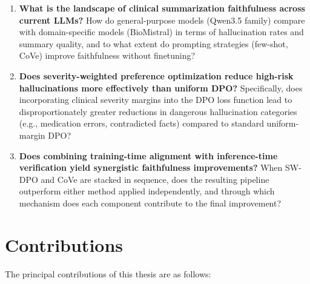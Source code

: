 \documentclass[12pt,a4paper,oneside]{report}
\begin{document}
\begin{enumerate}[label=\textbf{RQ\arabic*:}, leftmargin=3em]
    \item \textbf{What is the landscape of clinical summarization faithfulness across current LLMs?} How do general-purpose models (Qwen3.5 family) compare with domain-specific models (BioMistral) in terms of hallucination rates and summary quality, and to what extent do prompting strategies (few-shot, CoVe) improve faithfulness without finetuning?
    
    \item \textbf{Does severity-weighted preference optimization reduce high-risk hallucinations more effectively than uniform DPO?} Specifically, does incorporating clinical severity margins into the DPO loss function lead to disproportionately greater reductions in dangerous hallucination categories (e.g., medication errors, contradicted facts) compared to standard uniform-margin DPO?
    
    \item \textbf{Does combining training-time alignment with inference-time verification yield synergistic faithfulness improvements?} When SW-DPO and CoVe are stacked in sequence, does the resulting pipeline outperform either method applied independently, and through which mechanism does each component contribute to the final improvement?
\end{enumerate}

\section{Contributions}
\label{sec:contributions}

The principal contributions of this thesis are as follows:
\end{document}
